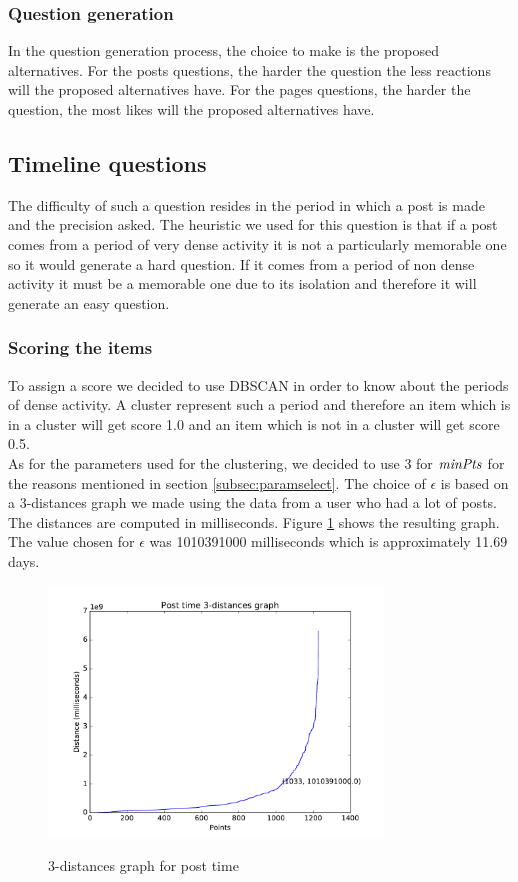 \subsubsection{Question generation}
In the question generation process, the choice to make is the proposed alternatives. For the posts questions, the harder the question the less reactions will the proposed alternatives have. For the pages questions, the harder the question, the most likes will the proposed alternatives have.
\subsection{Timeline questions}
The difficulty of such a question resides in the period in which a post is made and the precision asked. The heuristic we used for this question is that if a post comes from a period of very dense activity it is not a particularly memorable one so it would generate a hard question. If it comes from a period of non dense activity it must be a memorable one due to its isolation and therefore it will generate an easy question.
\subsubsection{Scoring the items}
To assign a score we decided to use DBSCAN in order to know about the periods of dense activity. A cluster represent such a period and therefore an item which is in a cluster will get score 1.0 and an item which is not in a cluster will get score 0.5.\\
As for the parameters used for the clustering, we decided to use 3 for $\mathit{minPts}$ for the reasons mentioned in section \ref{subsec:paramselect}. The choice of $\epsilon$ is based on a 3-distances graph we made using the data from a user who had a lot of posts. The distances are computed in milliseconds. Figure \ref{fig:postTime} shows the resulting graph. The value chosen for $\epsilon$ was 1010391000 milliseconds which is approximately 11.69 days.
\begin{figure}
\centering
{\includegraphics[width=3.5in]{images/post_time_knn.pdf}}
\caption{3-distances graph for post time}
\label{fig:postTime}
\end{figure}
